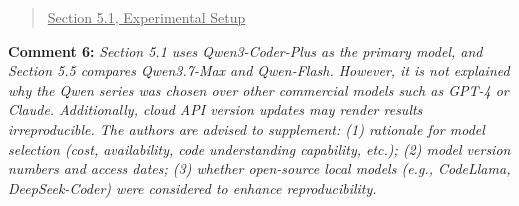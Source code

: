 \documentclass[onecolumn,11pt]{article}
\newcommand{\secc}[2]{\par\mySep \noindent \textsf{\textbf{#1 }}\textit{#2}\par}
\newcommand{\nc}[2]{\needspace{5\baselineskip}\begin{quote}\underline{#1}\\ \nopagebreak[4]{\leavevmode\color{blue}{``#2"}}\end{quote}}
\newcommand{\mySep}{\vspace{8pt}}
\begin{document}
\nc{Section 5.1, Experimental Setup}{This workflow is adopted because CKGFuzzer couples driver generation with a crash-analysis stage, so the adjudication pipeline can be extended without replacing the upstream fuzzing process; systems that target only input or driver generation do not expose a comparable crash-analysis interface.}

\secc{Comment 6:}{Section 5.1 uses Qwen3-Coder-Plus as the primary model, and Section 5.5 compares Qwen3.7-Max and Qwen-Flash. However, it is not explained why the Qwen series was chosen over other commercial models such as GPT-4 or Claude. Additionally, cloud API version updates may render results irreproducible. The authors are advised to supplement: (1) rationale for model selection (cost, availability, code understanding capability, etc.); (2) model version numbers and access dates; (3) whether open-source local models (e.g., CodeLlama, DeepSeek-Coder) were considered to enhance reproducibility.}
\end{document}
